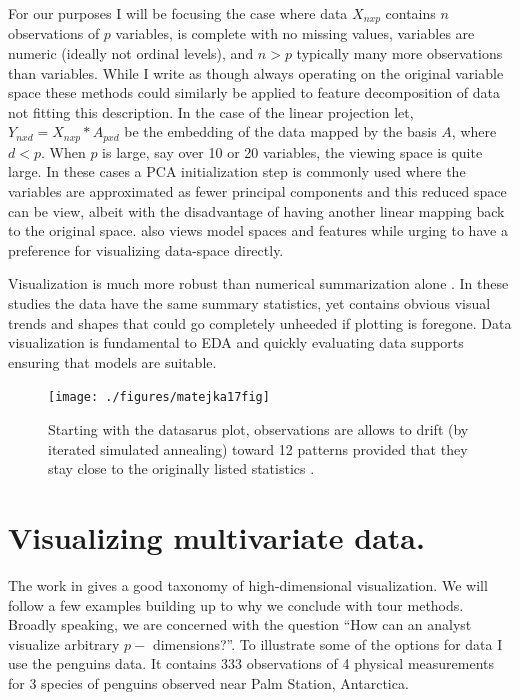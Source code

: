 \documentclass{template/monashthesis}
\begin{document}
For our purposes I will be focusing the case where data \(X_{nxp}\) contains \(n\) observations of \(p\) variables, is complete with no missing values, variables are numeric (ideally not ordinal levels), and \(n>p\) typically many more observations than variables. While I write as though always operating on the original variable space these methods could similarly be applied to feature decomposition of data not fitting this description. In the case of the linear projection let, \(Y_{nxd} = X_{nxp} * A_{pxd}\) be the embedding of the data mapped by the basis \(A\), where \(d<p\). When \(p\) is large, say over 10 or 20 variables, the viewing space is quite large. In these cases a PCA initialization step is commonly used where the variables are approximated as fewer principal components and this reduced space can be view, albeit with the disadvantage of having another linear mapping back to the original space. \textcite{wickham_visualizing_2015} also views model spaces and features while urging to have a preference for visualizing data-space directly.

Visualization is much more robust than numerical summarization alone \autocite{anscombe_graphs_1973,matejka_same_2017}. In these studies the data have the same summary statistics, yet contains obvious visual trends and shapes that could go completely unheeded if plotting is foregone. Data visualization is fundamental to EDA and quickly evaluating data supports ensuring that models are suitable.



\begin{figure}

{\centering \texttt{[image: ./figures/matejka17fig]} 

}

\caption{Starting with the datasarus plot, observations are allows to drift (by iterated simulated annealing) toward 12 patterns provided that they stay close to the originally listed statistics \autocite{matejka_same_2017}.}\label{fig:matejka17fig}
\end{figure}

\hypertarget{visualizing-multivariate-data.}{%
\section{Visualizing multivariate data.}\label{visualizing-multivariate-data.}}

The work in \textcite{grinstein_high-dimensional_2002} gives a good taxonomy of high-dimensional visualization. We will follow a few examples building up to why we conclude with tour methods. Broadly speaking, we are concerned with the question ``How can an analyst visualize arbitrary \(p-\) dimensions?''. To illustrate some of the options for data I use the penguins data\autocite[horst\_palmerpenguins\_2020]{gorman_ecological_2014}. It contains 333 observations of 4 physical measurements for 3 species of penguins observed near Palm Station, Antarctica.
\end{document}
